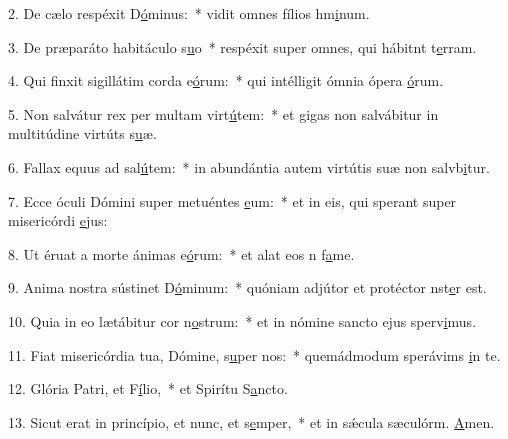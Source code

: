 2. De cælo respéxit D\uline{ó}minus:~* vidit omnes fílios hm\uline{i}num.\par 
3. De præparáto habitáculo s\uline{u}o~* respéxit super omnes, qui hábitnt t\uline{e}rram.\par 
4. Qui finxit sigillátim corda e\uline{ó}rum:~* qui intélligit ómnia ópera \uline{ó}rum.\par 
5. Non salvátur rex per multam virt\uline{ú}tem:~* et gigas non salvábitur in multitúdine virtúts s\uline{u}æ.\par 
6. Fallax equus ad sal\uline{ú}tem:~* in abundántia autem virtútis suæ non salvb\uline{i}tur.\par 
7. Ecce óculi Dómini super metuéntes \uline{e}um:~* et in eis, qui sperant super misericórdi \uline{e}jus:\par 
8. Ut éruat a morte ánimas e\uline{ó}rum:~* et alat eos n f\uline{a}me.\par 
9. Anima nostra sústinet D\uline{ó}minum:~* quóniam adjútor et protéctor nst\uline{e}r est.\par 
10. Quia in eo lætábitur cor n\uline{o}strum:~* et in nómine sancto ejus sperv\uline{i}mus.\par 
11. Fiat misericórdia tua, Dómine, s\uline{u}per nos:~* quemádmodum sperávims \uline{i}n te.\par 
12. Glória Patri, et F\uline{í}lio,~* et Spirítu S\uline{a}ncto.\par 
13. Sicut erat in princípio, et nunc, et s\uline{e}mper,~* et in sǽcula sæculórm. \uline{A}men.\par 
